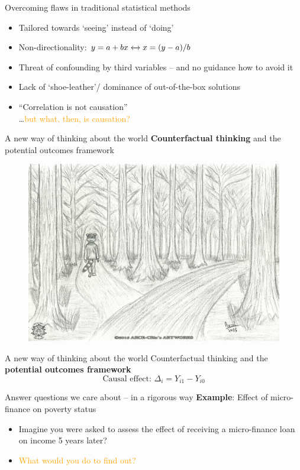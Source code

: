 \documentclass[12pt,english,dvipsnames,aspectratio=169, handout]{beamer}
\begin{document}
\begin{frame}{Overcoming flaws in traditional statistical methods}
\begin{itemize}
	\item Tailored towards `seeing' instead of `doing' \cite{pearl_book_2018}
	\item Non-directionality: $y = a + bx \xleftrightarrow{} x = (y-a)/b$		
	\item Threat of confounding by third variables -- and no guidance how to avoid it
	\item Lack of `shoe-leather'/ dominance of out-of-the-box solutions \cite{freedman_statistical_1991}
	\item ``Correlation is not causation''\\\ldots\textcolor{orange}{but what, then, is causation?}
\end{itemize}
\end{frame}

\begin{frame}{A new way of thinking about the world}
\textbf{Counterfactual thinking} and the potential outcomes framework 
    \begin{figure}
    \includegraphics[width=.6\textwidth]{../04-figures/01/02-the_road_not_taken_by_arcr_cric}
    \end{figure}
\end{frame}


\begin{frame}{A new way of thinking about the world}
Counterfactual thinking and the \textbf{potential outcomes framework} 
	\begin{equation*}
	\text{Causal effect: } {\Delta_i = Y_{i1} - Y_{i0}}
	\end{equation*}
\end{frame}


\begin{frame}{Answer questions we care about -- in a rigorous way}
\textbf{Example}: Effect of micro-finance on poverty status
\begin{itemize}
	\item Imagine you were asked to assess the effect of receiving a micro-finance loan on income 5 years later?
	\item \textcolor{orange}{What would you do to find out?}
\end{itemize}
\end{frame}
\end{document}
